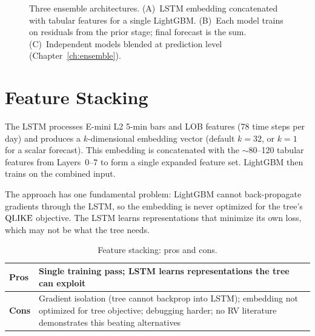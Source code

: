 \begin{figure}[htbp]
{%
}
\caption{Three ensemble architectures.
(A)~LSTM embedding concatenated with tabular features for a single LightGBM.
(B)~Each model trains on residuals from the prior stage; final forecast is the sum.
(C)~Independent models blended at prediction level (Chapter~\ref{ch:ensemble}).}
\label{fig:architecture-comparison}
\end{figure}


\section{Feature Stacking}
\label{sec:feature-stacking}

The LSTM processes E-mini L2 5-min bars and LOB features (78 time steps per day) and produces a $k$-dimensional embedding vector (default $k=32$, or $k=1$ for a scalar forecast).
This embedding is concatenated with the ${\sim}$80--120 tabular features from Layers~0--7 to form a single expanded feature set.
LightGBM then trains on the combined input.

The approach has one fundamental problem: LightGBM cannot back-propagate gradients through the LSTM, so the embedding is never optimized for the tree's $\operatorname{QLIKE}$ objective.
The LSTM learns representations that minimize its own loss, which may not be what the tree needs.

\begin{table}[htbp]
\centering
\caption{Feature stacking: pros and cons.}
\label{tab:feature-stacking}
\small
\begin{tabular}{@{}lp{10cm}@{}}
\toprule
\textbf{Pros} & Single training pass; LSTM learns representations the tree can exploit \\
\midrule
\textbf{Cons} & Gradient isolation (tree cannot backprop into LSTM); embedding not optimized for tree objective; debugging harder; no RV literature demonstrates this beating alternatives \\
\bottomrule
\end{tabular}
\end{table}


